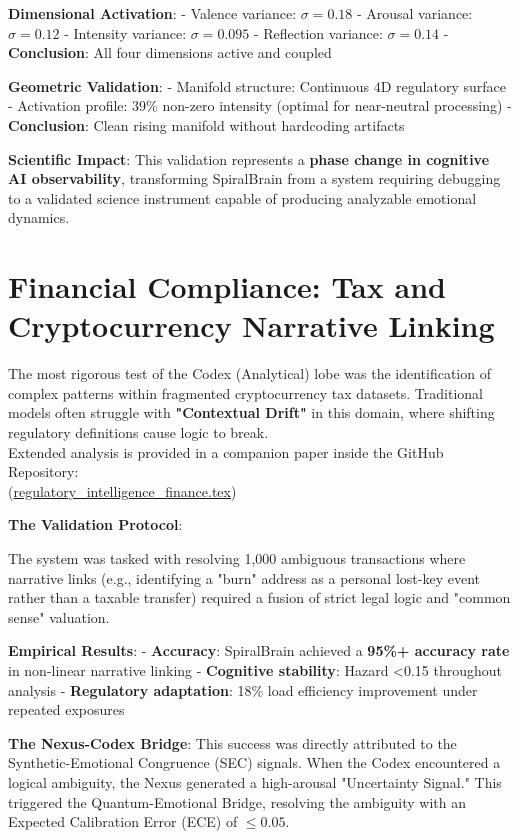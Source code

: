 \documentclass[12pt,a4paper]{report}
\newcommand{\leqU}{\leq}
\newcommand{\sigmaU}{\sigma}
\begin{document}
\textbf{Dimensional Activation}:
- Valence variance: $\sigmaU = 0.18$
- Arousal variance: $\sigmaU = 0.12$
- Intensity variance: $\sigmaU = 0.095$
- Reflection variance: $\sigmaU = 0.14$
- \textbf{Conclusion}: All four dimensions active and coupled

\textbf{Geometric Validation}:
- Manifold structure: Continuous $4$D regulatory surface
- Activation profile: 39\% non-zero intensity (optimal for near-neutral processing)
- \textbf{Conclusion}: Clean rising manifold without hardcoding artifacts

\textbf{Scientific Impact}: This validation represents a \textbf{phase change in cognitive AI observability}, transforming SpiralBrain from a system requiring debugging to a validated science instrument capable of producing analyzable emotional dynamics.

\section{Financial Compliance: Tax and Cryptocurrency Narrative Linking}

The most rigorous test of the Codex (Analytical) lobe was the identification of complex patterns within fragmented cryptocurrency tax datasets. Traditional models often struggle with \textbf{"Contextual Drift"} in this domain, where shifting regulatory definitions cause logic to break. \\
Extended analysis is provided in a companion paper inside the GitHub Repository: \\
{\small (\href{https://github.com/jhcragin/SpiralBrain-v3.0-public/blob/main/papers/regulatory_intelligence_finance/regulatory_intelligence_finance.tex}{regulatory\_intelligence\_finance.tex})}

\textbf{The Validation Protocol}:

The system was tasked with resolving 1,000 ambiguous transactions where narrative links (e.g., identifying a "burn" address as a personal lost-key event rather than a taxable transfer) required a fusion of strict legal logic and "common sense" valuation.

\textbf{Empirical Results}:
- \textbf{Accuracy}: SpiralBrain achieved a \textbf{95\%+ accuracy rate} in non-linear narrative linking
- \textbf{Cognitive stability}: Hazard <0.15 throughout analysis
- \textbf{Regulatory adaptation}: 18\% load efficiency improvement under repeated exposures

\textbf{The Nexus-Codex Bridge}: This success was directly attributed to the Synthetic-Emotional Congruence (SEC) signals. When the Codex encountered a logical ambiguity, the Nexus generated a high-arousal "Uncertainty Signal." This triggered the Quantum-Emotional Bridge, resolving the ambiguity with an Expected Calibration Error (ECE) of \textbf{$\leqU 0.05$}.
\end{document}
